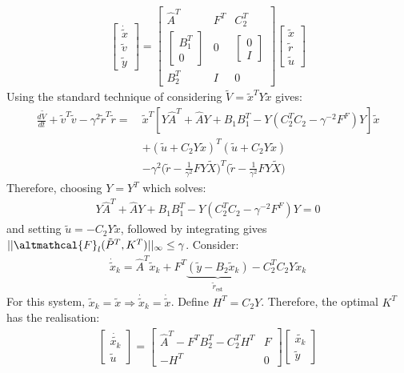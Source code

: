 \documentclass[a4paper]{book}
\newcommand{\ix}[1]{%
  \leavevmode %
  \marginpar{\small\emph{#1}}%
}
\begin{document}
\begin{align}
\begin{bmatrix}
	\dot{\tilde{x}} \\ \tilde{v} \\ \tilde{y}
\end{bmatrix} = 
\begin{bmatrix}
	\hat{A}^T & F^T & C_2^T \\
	\begin{bmatrix}
	B_1^T \\ 0
	\end{bmatrix} & 0 & \begin{bmatrix}
	0 \\ I
	\end{bmatrix} \\
	B_2^T & I & 0
	\end{bmatrix}
\begin{bmatrix}
	\tilde{x} \\ \tilde{r} \\ \tilde{u}
\end{bmatrix}
\end{align}
Using the standard technique of considering $\tilde{V} = \tilde{x}^T Y \tilde{x}$ gives:
\begin{align}
\frac{d\tilde{V}}{dt} + \tilde{v}^T \tilde{v} - \gamma^2  \tilde{r}^T  \tilde{r}  =\ &\tilde{x}^T [Y\hat{A}^T + \hat{A}Y + B_1B_1^T - Y(C_2^TC_2 - \gamma^{-2}F^F)Y]\tilde{x} \nonumber\\
&+ (\tilde{u} + C_2 Y \tilde{x})^T(\tilde{u} + C_2 Y \tilde{x}) \nonumber\\
&- \gamma^2 \Big(\tilde{r} - \frac{1}{\gamma^2} FY\tilde{X} \Big)^T\Big(\tilde{r} - \frac{1}{\gamma^2} FY\tilde{X} \Big)
\end{align}
Therefore, choosing $Y = Y^T$ which solves:
\begin{align}
Y\hat{A}^T + \hat{A}Y + B_1B_1^T - Y(C_2^TC_2 - \gamma^{-2}F^F)Y = 0
\end{align}
and setting $\tilde{u} = -C_2 Y \tilde{x}$, followed by integrating gives $||\altmathcal{F}_l (\tilde{P}^T, K^T)||_\infty \leq \gamma$. 
\ix{Optimal Observer}Consider:
\begin{align}
\dot{\tilde{x}}_k = \hat{A}^T \tilde{x}_k + F^T \underbrace{(\tilde{y} - B_2\tilde{x}_k)}_{\tilde{r}_\text{est}} - C_2^T C_2 Y\tilde{x}_k
\end{align}
For this system, $\tilde{x}_k = \tilde{x} \Rightarrow \dot{\tilde{x}}_k = \dot{\tilde{x}}$. Define $H^T = C_2 Y$. Therefore, the optimal $K^T$ has the realisation:
\begin{align}
\begin{bmatrix}
\dot{\tilde{x_k}} \\
\tilde{u}
\end{bmatrix}
= \begin{bmatrix}
\hat{A}^T - F^T B_2^T - C_2^T H^T & F \\
-H^T & 0
\end{bmatrix}\begin{bmatrix}
\tilde{x_k} \\
\tilde{y}
\end{bmatrix}
\end{align}
\end{document}
